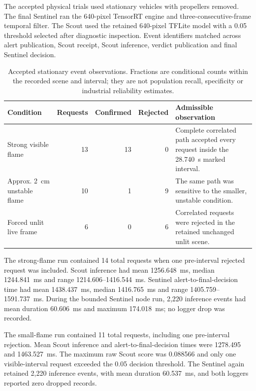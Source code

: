 The accepted physical trials used stationary vehicles with propellers removed.
The final Sentinel ran the 640-pixel TensorRT engine and three-consecutive-frame
temporal filter. The Scout used the retained 640-pixel TFLite model with a 0.05
threshold selected after diagnostic inspection. Event identifiers matched
across alert publication, Scout receipt, Scout inference, verdict publication
and final Sentinel decision.

\begin{table}[H]
  \centering
  \caption{Accepted stationary event observations. Fractions are conditional
  counts within the recorded scene and interval; they are not population
  recall, specificity or industrial reliability estimates.}
  \label{tab:integrated-condition-results}
  \small
  \begin{tabularx}{\textwidth}{@{}p{}rrrX@{}}
    \toprule
    Condition & Requests & Confirmed & Rejected & Admissible observation \\
    \midrule
    Strong visible flame & 13 & 13 & 0 & Complete correlated path accepted every request inside the 28.740~s marked interval. \\
    Approx. 2~cm unstable flame & 10 & 1 & 9 & The same path was sensitive to the smaller, unstable condition. \\
    Forced unlit live frame & 6 & 0 & 6 & Correlated requests were rejected in the retained unchanged unlit scene. \\
    \bottomrule
  \end{tabularx}
\end{table}

The strong-flame run contained 14 total requests when one pre-interval rejected
request was included. Scout inference had mean 1256.648~ms, median
1244.841~ms and range 1214.606--1416.544~ms. Sentinel alert-to-final-decision
time had mean 1438.437~ms, median 1416.765~ms and range
1405.759--1591.737~ms. During the bounded Sentinel node run, 2,220 inference
events had mean duration 60.606~ms and maximum 174.018~ms; no logger drop was
recorded.

The small-flame run contained 11 total requests, including one pre-interval
rejection. Mean Scout inference and alert-to-final-decision times were
1278.495 and 1463.527~ms. The maximum raw Scout score was 0.088566 and only
one visible-interval request exceeded the 0.05 decision threshold. The
Sentinel again retained 2,220 inference events, with mean duration 60.537~ms,
and both loggers reported zero dropped records.

